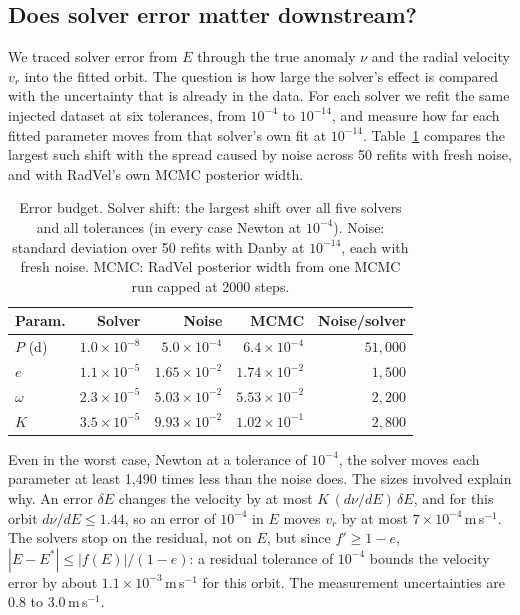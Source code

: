 \documentclass[sigconf,nonacm]{acmart}
\begin{document}
\subsection{Does solver error matter downstream?}
\label{sec:downstream}

We traced solver error from $E$ through the true anomaly $\nu$ and the
radial velocity $v_r$ into the fitted orbit. The question is how large
the solver's effect is compared with the uncertainty that is already in
the data. For each solver we refit the same injected dataset at six
tolerances, from $10^{-4}$ to $10^{-14}$, and measure how far each fitted
parameter moves from that solver's own fit at $10^{-14}$.
Table~\ref{tab:budget} compares the largest such shift with the spread
caused by noise across 50 refits with fresh noise, and with RadVel's own
MCMC posterior width.

\begin{table}[h]
\centering\small
\caption{Error budget. Solver shift: the largest shift over all five
solvers and all tolerances (in every case Newton at $10^{-4}$). Noise:
standard deviation over 50 refits with Danby at $10^{-14}$, each with
fresh noise. MCMC: RadVel posterior width from one MCMC run capped at
2000 steps.}
\label{tab:budget}
\begin{tabular}{@{}lrrrr@{}}
\toprule
\textbf{Param.} & \textbf{Solver} & \textbf{Noise} & \textbf{MCMC} & \textbf{Noise/solver} \\
\midrule
$P$ (d)  & $1.0\times10^{-8}$ & $5.0\times10^{-4}$  & $6.4\times10^{-4}$  & $51{,}000$ \\
$e$      & $1.1\times10^{-5}$ & $1.65\times10^{-2}$ & $1.74\times10^{-2}$ & $1{,}500$ \\
$\omega$ & $2.3\times10^{-5}$ & $5.03\times10^{-2}$ & $5.53\times10^{-2}$ & $2{,}200$ \\
$K$      & $3.5\times10^{-5}$ & $9.93\times10^{-2}$ & $1.02\times10^{-1}$ & $2{,}800$ \\
\bottomrule
\end{tabular}
\end{table}

Even in the worst case, Newton at a tolerance of $10^{-4}$, the solver
moves each parameter at least 1{,}490 times less than the noise does. The sizes involved explain
why. An error $\delta E$ changes the velocity by at most
$K\,(d\nu/dE)\,\delta E$, and for this orbit $d\nu/dE \le 1.44$, so an
error of $10^{-4}$ in $E$ moves $v_r$ by at most
$7\times10^{-4}$\,m\,s$^{-1}$. The solvers stop on the residual, not
on $E$, but since $f' \ge 1-e$, $|E - E^*| \le |f(E)|/(1-e)$: a residual
tolerance of $10^{-4}$ bounds the velocity error by about
$1.1\times10^{-3}$\,m\,s$^{-1}$ for this orbit. The measurement uncertainties are 0.8 to
3.0\,m\,s$^{-1}$.
\end{document}

